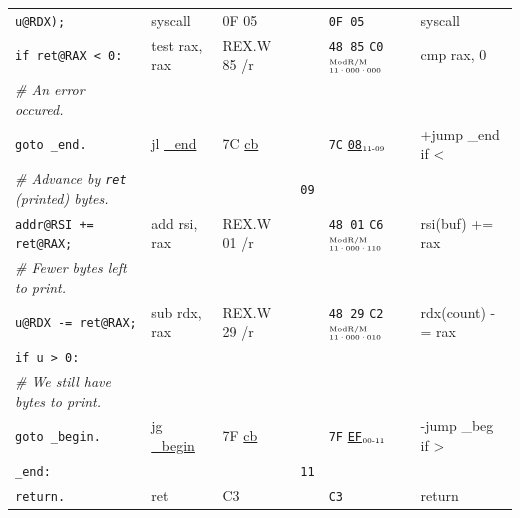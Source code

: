 \documentclass[a4paper,12pt,final]{article}
\begin{document}
\begin{table}[!htbp]
\begin{adjustwidth}{-1cm}{-1cm}
\begin{center}
\begin{tabular}{l|ll|l|lH}
\hspace{1em}\hspace{7.371000em}    \texttt{u@RDX);} & syscall & 0F 05 &  & \texttt{0F 05} & syscall\\[0pt]
\hspace{1em} \texttt{if ret@RAX < 0:} & test rax, rax & REX.W 85 /r &  & \texttt{48 85} \texttt{C0}​\(^{\text{\tiny ModR/M}}_{\text{\tiny 11·000·000}}\) & cmp rax, 0\\[0pt]
\hspace{2em} \emph{\# An error occured.} &  &  &  &  & \\[0pt]
\hspace{2em}     \texttt{goto \_end.} & jl \uline{\_end} & 7C \uline{cb} &  & \texttt{7C} \uline{\texttt{08}}​\(_{\text{\tiny 11-09}}\) & +jump \_end if <\\[0pt]
\hspace{1em} \emph{\# Advance by \texttt{ret} (printed) bytes.} &  &  & \texttt{09} &  & \\[0pt]
\hspace{1em} \texttt{addr@RSI += ret@RAX;} & add rsi, rax & REX.W 01 /r &  & \texttt{48 01} \texttt{C6}​\(^{\text{\tiny ModR/M}}_{\text{\tiny 11·000·110}}\) & rsi(buf) += rax\\[0pt]
\hspace{1em} \emph{\# Fewer bytes left to print.} &  &  &  &  & \\[0pt]
\hspace{1em} \texttt{u@RDX -= ret@RAX;} & sub rdx, rax & REX.W 29 /r &  & \texttt{48 29} \texttt{C2}​\(^{\text{\tiny ModR/M}}_{\text{\tiny 11·000·010}}\) & rdx(count) -= rax\\[0pt]
\hspace{1em} \texttt{if u > 0:} &  &  &  &  & \\[0pt]
\hspace{2em}     \emph{\# We still have bytes to print.} &  &  &  &  & \\[0pt]
\hspace{2em}     \texttt{goto \_begin.} & jg \uline{\_begin} & 7F \uline{cb} &  & \texttt{7F} \uline{\texttt{EF}}​\(_{\text{\tiny 00-11}}\) & -jump \_beg if >\\[0pt]
\texttt{\_end:} &  &  & \texttt{11} &  & \\[0pt]
\hspace{1em} \texttt{return.} & ret & C3 &  & \texttt{C3} & return\\[0pt]
\end{tabular}

\end{center}
\normalsize \end{adjustwidth} \end{table} \vspace{0}
\end{document}
